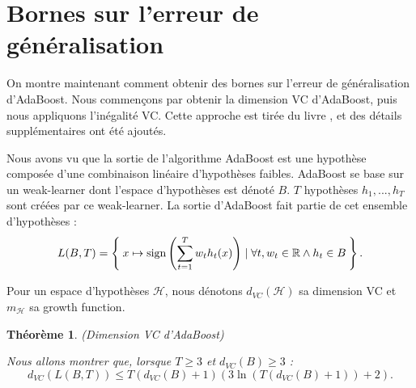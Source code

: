 \documentclass[12pt]{article}
\newcommand{\R}{\mathbb{R}}
\newtheorem{theorem}{Théorème}
\begin{document}
	\section{Bornes sur l’erreur de généralisation}
	
	On montre maintenant comment obtenir des bornes sur l'erreur de généralisation d'AdaBoost.
	Nous commençons par obtenir la dimension VC d'AdaBoost, puis nous appliquons l'inégalité VC.
	Cette approche est tirée du livre \cite{Shalev-Shwartz2014-ba}, et des détails supplémentaires ont été ajoutés.
	
	Nous avons vu que la sortie de l'algorithme AdaBoost est une hypothèse composée d'une combinaison linéaire d'hypothèses faibles.
	AdaBoost se base sur un weak-learner dont l'espace d'hypothèses est dénoté $B$.
	$T$ hypothèses $h_1, ..., h_T$ sont créées par ce weak-learner.
	La sortie d'AdaBoost fait partie de cet ensemble d'hypothèses :
	\[
	L(B, T) = \Set{ x \mapsto \text{sign}\left( \sum_{t=1}^T w_t h_t(x) \right) \mid \forall t, w_t \in \R \land h_t \in B}.
	\]
	
	Pour un espace d'hypothèses $\mathcal{H}$, nous dénotons $d_{VC}(\mathcal{H})$ sa dimension VC et $m_{\mathcal{H}}$ sa growth function.
	
	\begin{theorem}{(Dimension VC d'AdaBoost)}
		
		Nous allons montrer que, lorsque $T \geq 3$ et $d_{VC}(B) \geq 3$ :
		\[
		d_{VC}(L(B, T)) \leq T(d_{VC}(B) + 1) (3 \ln(T (d_{VC}(B) + 1)) + 2).
		\]
	\end{theorem}
\end{document}
